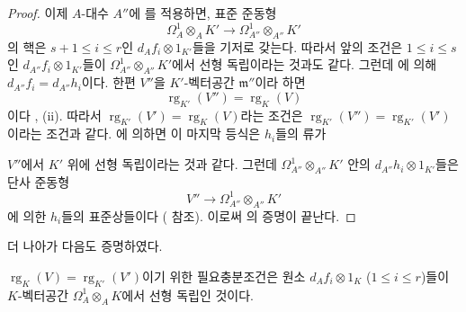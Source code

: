 \begin{proof}
이제 $A$-대수 $A''$에 를 적용하면, 표준 준동형
\[
  \Omega^1_A\otimes_AK'\longrightarrow
  \Omega^1_{A''}\otimes_{A''}K'
\]
의 핵은 $s+1\leqslant i\leqslant r$인
$d_Af_i\otimes1_{K'}$들을 기저로 갖는다. 따라서 앞의 조건은
$1\leqslant i\leqslant s$인 $d_{A''}f_i\otimes1_{K'}$들이
$\Omega^1_{A''}\otimes_{A''}K'$에서 선형 독립이라는 것과도 같다.
그런데 에 의해
$d_{A''}f_i=d_{A''}h_i$이다. 한편 $V''$을 $K'$-벡터공간
$\mathfrak m''$이라 하면
\[
  \operatorname{rg}_{K'}(V'')=\operatorname{rg}_K(V)
\]
이다 , (ii). 따라서
$\operatorname{rg}_{K'}(V')=\operatorname{rg}_K(V)$라는 조건은
$\operatorname{rg}_{K'}(V'')=\operatorname{rg}_{K'}(V')$이라는 조건과
같다. 에 의하면 이 마지막 등식은 $h_i$들의 류가


$V''$에서 $K'$ 위에 선형 독립이라는 것과 같다. 그런데
$\Omega^1_{A''}\otimes_{A''}K'$ 안의
$d_{A''}h_i\otimes1_{K'}$들은 단사 준동형
\[
  V''\longrightarrow\Omega^1_{A''}\otimes_{A''}K'
\]
에 의한 $h_i$들의 표준상들이다
 ( 참조). 이로써
의 증명이 끝난다.
\end{proof}

더 나아가 다음도 증명하였다.

\begin{corollary}[22.4.7.4]
\label{0.22.4.7.4-ko}
$\operatorname{rg}_K(V)=\operatorname{rg}_{K'}(V')$이기 위한 필요충분조건은
원소 $d_Af_i\otimes1_K$ ($1\leqslant i\leqslant r$)들이
$K$-벡터공간 $\Omega^1_A\otimes_AK$에서 선형 독립인 것이다.
\end{corollary}

